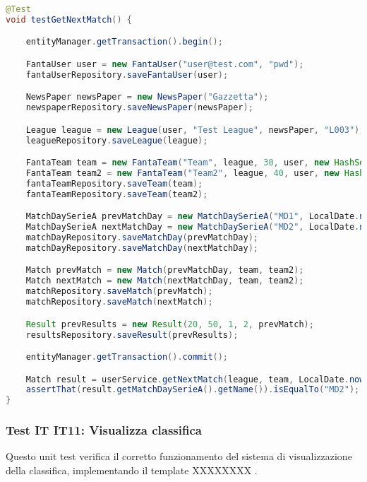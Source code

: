 \begin{lstlisting}[language=Java]
@Test
void testGetNextMatch() {

	entityManager.getTransaction().begin();

	FantaUser user = new FantaUser("user@test.com", "pwd");
	fantaUserRepository.saveFantaUser(user);

	NewsPaper newsPaper = new NewsPaper("Gazzetta");
	newspaperRepository.saveNewsPaper(newsPaper);

	League league = new League(user, "Test League", newsPaper, "L003");
	leagueRepository.saveLeague(league);

	FantaTeam team = new FantaTeam("Team", league, 30, user, new HashSet<>());
	FantaTeam team2 = new FantaTeam("Team2", league, 40, user, new HashSet<>());
	fantaTeamRepository.saveTeam(team);
	fantaTeamRepository.saveTeam(team2);

	MatchDaySerieA prevMatchDay = new MatchDaySerieA("MD1", LocalDate.now().minusWeeks(1));
	MatchDaySerieA nextMatchDay = new MatchDaySerieA("MD2", LocalDate.now().plusWeeks(1));
	matchDayRepository.saveMatchDay(prevMatchDay);
	matchDayRepository.saveMatchDay(nextMatchDay);

	Match prevMatch = new Match(prevMatchDay, team, team2);
	Match nextMatch = new Match(nextMatchDay, team, team2);
	matchRepository.saveMatch(prevMatch);
	matchRepository.saveMatch(nextMatch);

	Result prevResults = new Result(20, 50, 1, 2, prevMatch);
	resultsRepository.saveResult(prevResults);

	entityManager.getTransaction().commit();

	Match result = userService.getNextMatch(league, team, LocalDate.now());
	assertThat(result.getMatchDaySerieA().getName()).isEqualTo("MD2");
}
\end{lstlisting}


\subsubsection{Test IT IT11: Visualizza classifica} \label{IT11}

Questo unit test verifica il corretto funzionamento del sistema di visualizzazione della classifica,
implementando il template XXXXXXXX .

